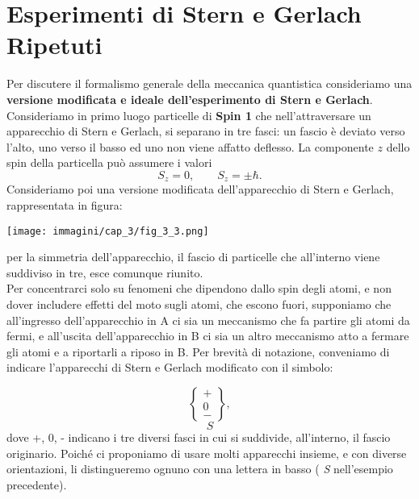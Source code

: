 \documentclass[a4paper,12pt,oneside]{book}
\begin{document}
\section{Esperimenti di Stern e Gerlach Ripetuti} 
Per discutere il formalismo generale della meccanica quantistica consideriamo una \textbf{versione modificata e ideale dell'esperimento di Stern e Gerlach}.\\
 
Consideriamo in primo luogo particelle di \textbf{Spin 1} che nell'attraversare un apparecchio di Stern e Gerlach, si separano in tre fasci: un fascio è deviato verso l'alto, uno verso il basso ed uno non viene affatto deflesso. La componente $z$ dello spin della particella può assumere i valori
	\begin{equation}
		S_z=0, \qquad S_z= \pm \hbar .
	\end{equation}
Consideriamo poi una versione modificata dell'apparecchio di Stern e Gerlach, rappresentata in figura: \\
\begin{center}
\texttt{[image: immagini/cap\_3/fig\_3\_3.png]}
\end{center}

per la simmetria dell'apparecchio, il fascio di particelle che all'interno viene suddiviso in tre, esce comunque riunito.\\

Per concentrarci solo su fenomeni che dipendono dallo spin degli atomi, e non  dover includere effetti del moto sugli atomi, che escono fuori, supponiamo che all'ingresso dell'apparecchio in A ci sia un meccanismo che fa partire gli atomi da fermi, e all'uscita dell'apparecchio in B ci sia un altro meccanismo atto a fermare gli atomi e a riportarli a riposo in B. Per brevità  di notazione, conveniamo di indicare l'apparecchi di Stern e Gerlach modificato con il simbolo:

	\begin{equation}
		\begin{Bmatrix} + \\ 0 \\ -  \end{Bmatrix},
	\end{equation}
	\begin{equation*}
		S
	\end{equation*}
dove +, 0, - indicano i tre diversi fasci in cui si suddivide, all'interno, il fascio originario. Poiché ci proponiamo di usare molti apparecchi insieme, e con diverse orientazioni, li distingueremo ognuno con una lettera in basso ( \emph{S} nell'esempio precedente).\\
\end{document}
